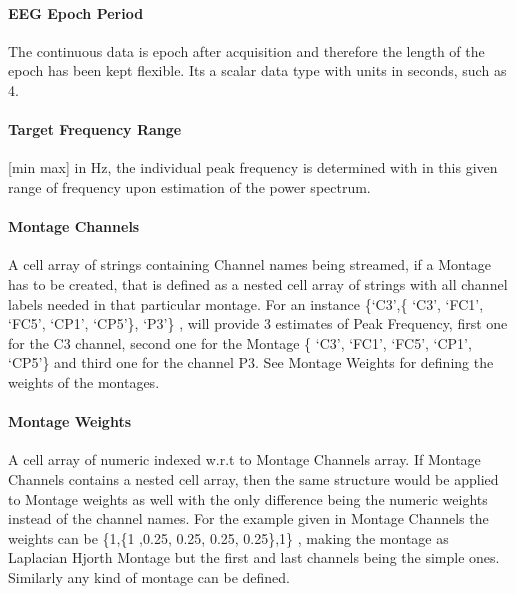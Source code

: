 \documentclass[letterpaper,10pt,english]{sphinxmanual}
\begin{document}
\paragraph{EEG Epoch Period}
\label{\detokenize{10_rsEEGMeasurement:eeg-epoch-period}}
\sphinxAtStartPar
The continuous data is epoch after acquisition and therefore the length of the epoch has been kept flexible. Its a scalar data type with units in seconds, such as 4.


\paragraph{Target Frequency Range}
\label{\detokenize{10_rsEEGMeasurement:target-frequency-range}}
\sphinxAtStartPar
{[}min max{]} in Hz, the individual peak frequency is determined with in this given range of frequency upon estimation of the power spectrum.


\paragraph{Montage Channels}
\label{\detokenize{10_rsEEGMeasurement:montage-channels}}
\sphinxAtStartPar
A cell array of strings containing Channel names being streamed, if a Montage has to be created, that is defined as a nested cell array of strings with all channel labels needed in that particular montage. For an instance \{‘C3’,\{ ‘C3’, ‘FC1’, ‘FC5’, ‘CP1’, ‘CP5’\}, ‘P3’\} , will provide 3 estimates of Peak Frequency, first one for the C3 channel, second one for the Montage \{ ‘C3’, ‘FC1’, ‘FC5’, ‘CP1’, ‘CP5’\} and third one for the channel P3. See Montage Weights for defining the weights of the montages.


\paragraph{Montage Weights}
\label{\detokenize{10_rsEEGMeasurement:montage-weights}}
\sphinxAtStartPar
A cell array of numeric indexed w.r.t to Montage Channels array. If Montage Channels contains a nested cell array, then the same structure would be applied to Montage weights as well with the only difference being the numeric weights instead of the channel names. For the example given in Montage Channels the weights can be \{1,\{1 ,\sphinxhyphen{}0.25, \sphinxhyphen{}0.25, \sphinxhyphen{}0.25, \sphinxhyphen{}0.25\},1\} , making the montage as Laplacian Hjorth Montage but the first and last channels being the simple ones. Similarly any kind of montage can be defined.
\end{document}

